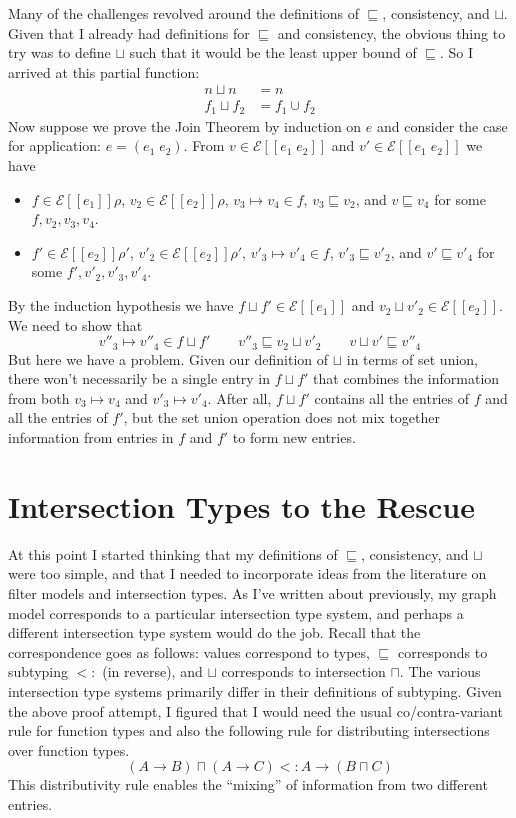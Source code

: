 \documentclass{article}
\newcommand{\app}[0]{\;}
\newcommand{\SEM}[1]{[\![ #1 ]\!]}
\newcommand{\ESEM}[1]{\mathcal{E}\SEM{#1}}
\begin{document}
Many of the challenges revolved around the definitions of
$\sqsubseteq$, consistency, and $\sqcup$. Given that I already had
definitions for $\sqsubseteq$ and consistency, the obvious thing to
try was to define $\sqcup$ such that it would be the least upper bound
of $\sqsubseteq$. So I arrived at this partial function:
\begin{align*}
  n \sqcup n &= n \\
  f_1 \sqcup f_2 &= f_1 \cup f_2
\end{align*}
Now suppose we prove the Join Theorem by induction on $e$ and consider
the case for application: $e = (e_1 \app e_2)$. From $v \in \ESEM{e_1
  \app e_2}$ and $v' \in \ESEM{e_1 \app e_2}$ we have
\begin{itemize}
\item $f \in \ESEM{e_1}\rho$, $v_2 \in \ESEM{e_2}\rho$,  
  $v_3 \mapsto v_4 \in f$, $v_3 \sqsubseteq v_2$, and $v \sqsubseteq v_4$
  for some $f, v_2, v_3, v_4$.
\item $f' \in \ESEM{e_2}\rho'$, $v'_2 \in \ESEM{e_2}\rho'$,   
  $v'_3 \mapsto v'_4 \in f$, $v'_3 \sqsubseteq v'_2$, and $v' \sqsubseteq v'_4$
  for some $f', v'_2, v'_3, v'_4$.
\end{itemize}
By the induction hypothesis we have $f \sqcup f' \in \ESEM{e_1}$
and $v_2 \sqcup v'_2 \in \ESEM{e_2}$.
We need to show that 
\[
   v''_3 \mapsto v''_4 \in f \sqcup f' 
   \qquad
   v''_3 \sqsubseteq v_2 \sqcup v'_2
   \qquad
   v \sqcup v' \sqsubseteq v''_4
\]
But here we have a problem. Given our definition of $\sqcup$ in terms
of set union, there won't necessarily be a single entry in $f \sqcup
f'$ that combines the information from both $v_3 \mapsto v_4$ and
$v'_3 \mapsto v'_4$. After all, $f \sqcup f'$ contains all the entries
of $f$ and all the entries of $f'$, but the set union operation does
not mix together information from entries in $f$ and $f'$ to form new
entries.

\section{Intersection Types to the Rescue}

At this point I started thinking that my definitions of $\sqsubseteq$,
consistency, and $\sqcup$ were too simple, and that I needed to
incorporate ideas from the literature on filter models and
intersection types. As I've written about previously, my graph model
corresponds to a particular intersection type system, and perhaps a
different intersection type system would do the job. Recall that the
correspondence goes as follows: values correspond to types,
$\sqsubseteq$ corresponds to subtyping $<:$ (in reverse), and $\sqcup$
corresponds to intersection $\sqcap$. The various intersection type
systems primarily differ in their definitions of subtyping.  Given the
above proof attempt, I figured that I would need the usual
co/contra-variant rule for function types and also the following rule
for distributing intersections over function types.
\[
  (A\to B) \sqcap (A \to C) <: A \to (B \sqcap C)
\]
This distributivity rule enables the ``mixing'' of information from
two different entries.
\end{document}
